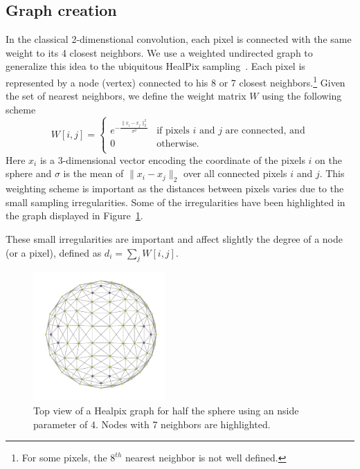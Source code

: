 \documentclass[final,twocolumn,3p,times,authoryear]{elsarticle}
\newcommand{\1}{\b{1}}              %
\newcommand{\0}{\b{0}}              %
\begin{document}
\subsection{Graph creation}
In the classical 2-dimenstional convolution, each pixel is connected with the
same weight to its 4 closest neighbors. We use a weighted undirected graph to
generalize this idea to the ubiquitous HealPix
sampling~\citep{gorski2005healpix}.  Each pixel is represented by a node
(vertex) connected to his $8$ or $7$ closest neighbors.\footnote{For some
pixels, the $8^{th}$ nearest neighbor is not well defined.} Given the set of
nearest neighbors, we define the weight matrix $W$ using the following scheme
\begin{equation}
W[i,j]=\begin{cases}
e^{-\frac{\|x_i-x_j\|_2^2}{\sigma^2}} & \text{if pixels $i$ and $j$ are connected, and}\\
0 & \text{otherwise.}\\
\end{cases}
\end{equation}
Here $x_i$ is a 3-dimensional vector encoding the coordinate of the pixels $i$
on the sphere and $\sigma$ is the mean of $\|x_i-x_j\|_2$ over all connected
pixels $i$ and $j$. This weighting scheme is important as the distances between
pixels varies due to the small sampling irregularities. Some of the
irregularities have been highlighted in the graph displayed in
Figure~\ref{fig:healpix_graph_4}.

These small irregularities are important and affect slightly the degree of a
node (or a pixel), defined as $d_i =\sum_j W[i,j]$.

\begin{figure}[!ht]
\centering
\vspace{-0.5cm}
\includegraphics[width=0.45\textwidth]{figures/half_graph_4.pdf}
\vspace{-0.5cm}
\caption{
Top view of a Healpix graph for half the sphere using an nside parameter of $4$.
Nodes with 7 neighbors are highlighted.
}
\label{fig:healpix_graph_4}
\end{figure}
\end{document}
